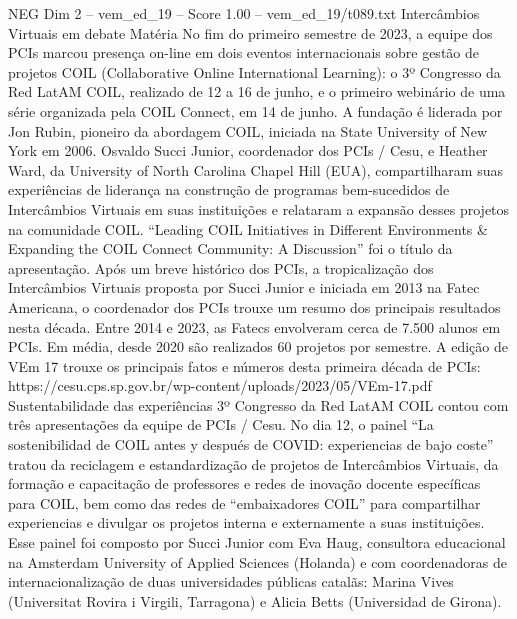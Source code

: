 \begin{textsample}{NEG Dim 2 – vem\_ed\_19 – Score 1.00 – vem\_ed\_19/t089.txt}  \label{ex:f2_neg_050}
Intercâmbios Virtuais em debate Matéria No fim do primeiro semestre de 2023, a equipe dos PCIs marcou presença on-line em dois eventos internacionais sobre gestão de projetos COIL (Collaborative Online International Learning): o 3º Congresso da Red LatAM COIL, realizado de 12 a 16 de junho, e o primeiro webinário de uma série organizada pela COIL Connect, em 14 de junho.
A fundação é liderada por Jon Rubin, pioneiro da abordagem COIL, iniciada na State University of New York em 2006.
Osvaldo Succi Junior, coordenador dos PCIs / Cesu, e Heather Ward, da University of North Carolina Chapel Hill (EUA), compartilharam suas experiências de liderança na construção de programas bem-sucedidos de Intercâmbios Virtuais em suas instituições e relataram a expansão desses projetos na comunidade COIL. “Leading COIL Initiatives in Different Environments \& Expanding the COIL Connect Community: A Discussion” foi o título da apresentação.
Após um breve histórico dos PCIs, a tropicalização dos Intercâmbios Virtuais proposta por Succi Junior e iniciada em 2013 na Fatec Americana, o coordenador dos PCIs trouxe um resumo dos principais resultados nesta década.
Entre 2014 e 2023, as Fatecs envolveram cerca de 7.500 alunos em PCIs.
Em média, desde 2020 são realizados 60 projetos por semestre.
A edição de VEm 17 trouxe os principais fatos e números desta primeira década de PCIs: https://cesu.cps.sp.gov.br/wp-content/uploads/2023/05/VEm-17.pdf Sustentabilidade das experiências 3º Congresso da Red LatAM COIL contou com três apresentações da equipe de PCIs / Cesu.
No dia 12, o painel “La sostenibilidad de COIL antes y después de COVID: experiencias de bajo coste” tratou da reciclagem e estandardização de projetos de Intercâmbios Virtuais, da formação e capacitação de professores e redes de inovação docente específicas para COIL, bem como das redes de “embaixadores COIL” para compartilhar experiencias e divulgar os projetos interna e externamente a suas instituições.
Esse painel foi composto por Succi Junior com Eva Haug, consultora educacional na Amsterdam University of Applied Sciences (Holanda) e com coordenadoras de internacionalização de duas universidades públicas catalãs: Marina Vives (Universitat Rovira i Virgili, Tarragona) e Alicia Betts (Universidad de Girona).

\end{textsample}
